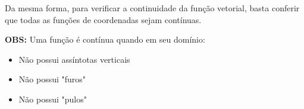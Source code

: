 \documentclass[letterpaper, 11pt]{article}
\begin{document}
Da mesma forma, para verificar a continuidade da função vetorial, basta conferir que todas as funções de coordenadas sejam contínuas.

\textbf{OBS:} Uma função é contínua quando em seu domínio:
\begin{itemize}
\item Não possui assíntotas verticais
\item Não possui "furos"
\item Não possui "pulos"
\end{itemize}
\end{document}
